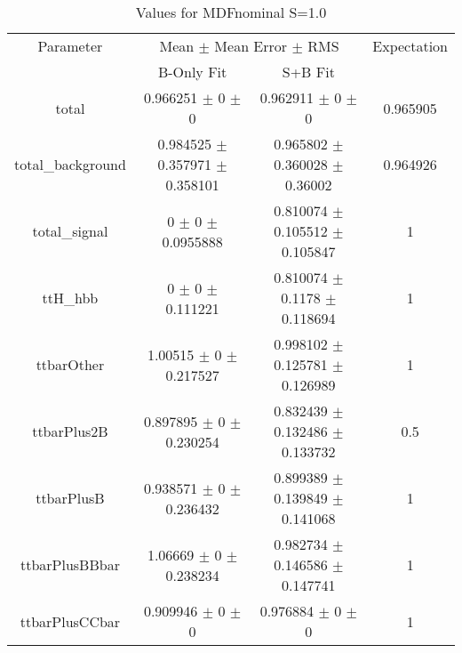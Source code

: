 \begin{table}
\centering
\caption{Values for MDFnominal S=1.0}
\begin{tabular}{cccc}
\toprule
Parameter & \multicolumn{2}{c}{Mean $\pm$ Mean Error $\pm$ RMS} & Expectation\\
 & B-Only Fit & S+B Fit & \\
\midrule
total & \num{0.966251} $\pm$ \num{0} $\pm$ \num{0} & \num{0.962911} $\pm$ \num{0} $\pm$ \num{0} & \num{0.965905}\\
total\_background & \num{0.984525} $\pm$ \num{0.357971} $\pm$ \num{0.358101} & \num{0.965802} $\pm$ \num{0.360028} $\pm$ \num{0.36002} & \num{0.964926}\\
total\_signal & \num{0} $\pm$ \num{0} $\pm$ \num{0.0955888} & \num{0.810074} $\pm$ \num{0.105512} $\pm$ \num{0.105847} & \num{1}\\
ttH\_hbb & \num{0} $\pm$ \num{0} $\pm$ \num{0.111221} & \num{0.810074} $\pm$ \num{0.1178} $\pm$ \num{0.118694} & \num{1}\\
ttbarOther & \num{1.00515} $\pm$ \num{0} $\pm$ \num{0.217527} & \num{0.998102} $\pm$ \num{0.125781} $\pm$ \num{0.126989} & \num{1}\\
ttbarPlus2B & \num{0.897895} $\pm$ \num{0} $\pm$ \num{0.230254} & \num{0.832439} $\pm$ \num{0.132486} $\pm$ \num{0.133732} & \num{0.5}\\
ttbarPlusB & \num{0.938571} $\pm$ \num{0} $\pm$ \num{0.236432} & \num{0.899389} $\pm$ \num{0.139849} $\pm$ \num{0.141068} & \num{1}\\
ttbarPlusBBbar & \num{1.06669} $\pm$ \num{0} $\pm$ \num{0.238234} & \num{0.982734} $\pm$ \num{0.146586} $\pm$ \num{0.147741} & \num{1}\\
ttbarPlusCCbar & \num{0.909946} $\pm$ \num{0} $\pm$ \num{0} & \num{0.976884} $\pm$ \num{0} $\pm$ \num{0} & \num{1}\\
\bottomrule
\end{tabular}
\end{table}